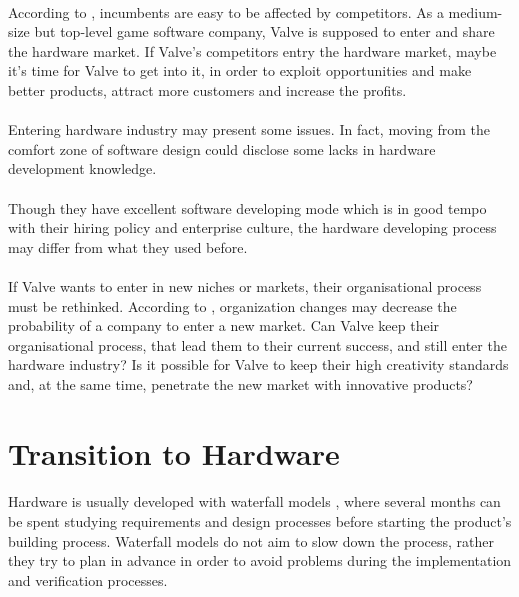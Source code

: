 \documentclass[12pt,twoside,notitle,a4paper]{article}
\begin{document}
\paragraph{}According to \citep*{debruyne2005competitor}, incumbents are easy to be affected by competitors. As a medium-size but top-level game software company, Valve is supposed to enter and share the hardware market. If Valve's competitors entry the hardware market, maybe it's time for Valve to get into it, in order to exploit opportunities and make better products, attract more customers and increase the profits. 
\paragraph{}Entering hardware industry may present some issues. In fact, moving from the comfort zone of software design could disclose some lacks in hardware development knowledge.
\paragraph{}Though they have excellent software developing mode which is in good tempo with their hiring policy and enterprise culture, the hardware developing process may differ from what they used before. 

\paragraph{}If Valve wants to enter in new niches or markets, their organisational process must be rethinked. According to \citep*{king2002incumbent}, organization changes may decrease the probability of a company to enter a new market. 
Can Valve keep their organisational process, that lead them to their current success, and still enter the hardware industry? 
Is it possible for Valve to keep their high creativity standards and, at the same time, penetrate the new market with innovative products?


\section{Transition to Hardware}
\paragraph{}Hardware is usually developed with waterfall models \citep*{boehm1988spiral}, where several months can be spent studying requirements and design processes before starting the product’s building process.
Waterfall models do not aim to slow down the process, rather they try to plan in advance in order to avoid problems during the implementation and verification processes.
\end{document}
